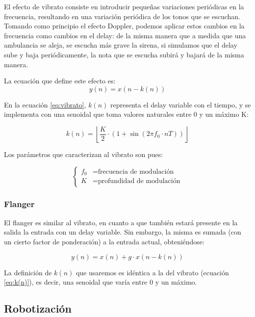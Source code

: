 \documentclass[assd_tp2_main.tex]{subfiles}
\begin{document}
El efecto de vibrato consiste en introducir peque\~nas variaciones peri\'odicas en la frecuencia, resultando en una variaci\'on peri\'odica de los tonos que se escuchan. Tomando como principio el efecto Doppler, podemos aplicar estos cambios en la frecuencia como cambios en el delay: de la misma manera que a medida que una ambulancia se aleja, se escucha m\'as grave  la sirena, si simulamos que el delay sube y baja peri\'odicamente, la nota que se escucha subir\'a y bajar\'a de la misma manera.

La ecuaci\'on que define este efecto es:
\begin{equation}
	y(n) = x\left(n - k(n) \right)
	\label{eq:vibrato}
\end{equation}

En la ecuaci\'on \ref{eq:vibrato}, $k(n)$ representa el delay variable con el tiempo, y se implementa con una senoidal que toma valores naturales entre 0 y un m\'aximo K:

\begin{equation}
	k(n) = \left \lfloor \frac{K}{2} \cdot 
		\left( 1 + \sin{\left(2\pi f_0 \cdot nT\right)} \right) \right \rfloor
		\label{eq:k(n)}
\end{equation}

Los par\'ametros que caracterizan al vibrato son pues:

\begin{equation}
	\left\{
	\begin{aligned}
		f_0	&= \text{frecuencia de modulaci\'on} \\
		K   	&= \text{profundidad de modulaci\'on}
	\end{aligned}	
	\right.
\end{equation}





\subsubsection{Flanger}

El flanger es similar al vibrato, en cuanto a que tambi\'en estar\'a presente en la salida la entrada con un delay variable. Sin embargo, la misma es sumada (con un cierto factor de ponderaci\'on) a la entrada actual, obteni\'endose:

\begin{equation}
	y(n) = x(n) + g\cdot x(n-k(n))
\end{equation}

La definici\'on de $k(n)$ que usaremos es id\'entica a la del vibrato (ecuaci\'on \ref{eq:k(n)}), es decir, una senoidal que var\'ia entre 0 y un m\'aximo.


\subsection{Robotizaci\'on}
\end{document}
